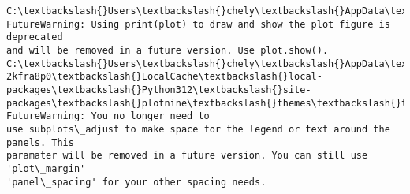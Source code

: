 \documentclass[11pt]{article}
\begin{document}
    \begin{Verbatim}[commandchars=\\\{\}]
C:\textbackslash{}Users\textbackslash{}chely\textbackslash{}AppData\textbackslash{}Local\textbackslash{}Temp\textbackslash{}ipykernel\_20580\textbackslash{}1629869834.py:17:
FutureWarning: Using print(plot) to draw and show the plot figure is deprecated
and will be removed in a future version. Use plot.show().
C:\textbackslash{}Users\textbackslash{}chely\textbackslash{}AppData\textbackslash{}Local\textbackslash{}Packages\textbackslash{}PythonSoftwareFoundation.Python.3.12\_qbz5n
2kfra8p0\textbackslash{}LocalCache\textbackslash{}local-packages\textbackslash{}Python312\textbackslash{}site-
packages\textbackslash{}plotnine\textbackslash{}themes\textbackslash{}themeable.py:2419: FutureWarning: You no longer need to
use subplots\_adjust to make space for the legend or text around the panels. This
paramater will be removed in a future version. You can still use 'plot\_margin'
'panel\_spacing' for your other spacing needs.
    \end{Verbatim}

    \begin{center}
    \end{center}
    { \hspace*{\fill} \\}
    
    \begin{Verbatim}[commandchars=\\\{\}]

    \end{Verbatim}
\end{document}
